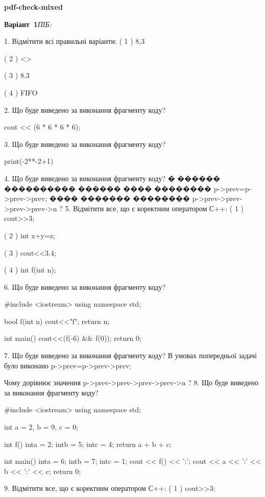 \documentclass[11pt]{article}
\begin{document}
{\large\textbf{pdf-check-mixed}}

\textbf{Варіант \No\,1}\hfill \textit{ПІБ:}\,\underline{\hspace{60mm}}
\vspace{4mm}

1. Відмітити всі правильні варіанти:
( 1 ) 8,3

( 2 ) <>

( 3 ) 8.3

( 4 ) FIFO

2. Що буде виведено за виконання фрагменту коду?

cout << (6 * 6 * 6 * 6);

3. Що буде виведено за виконання фрагменту коду?

print(-2**-2+1)

4. Що буде виведено за виконання фрагменту коду?
� ������ ���������� ������ ���� �������� p->prev=p->prev->prev;
���� ������� �������� p->prev->prev->prev->prev->n ?
5. Відмітити все, що є коректним оператором С++:
( 1 ) cout>>3;

( 2 ) int x+y=z;

( 3 ) cout<<3.4;

( 4 ) int f(int n);

6. Що буде виведено за виконання фрагменту коду?

#include <iostream>
using namespace std;

bool f(int n){
    cout<<"f";
    return n;
}

int main(){
    cout<<(f(-6) && f(0));
    return 0;
}

7. Що буде виведено за виконання фрагменту коду?
В умовах попередньої задачі було виконано p->prev=p->prev->prev;

Чому дорівнює значення p->prev->prev->prev->prev->n ?
8. Що буде виведено за виконання фрагменту коду?

#include <iostream>
using namespace std;

int a = 2, b = 9, c = 0;

int f(){
    inta = 2;
    intb = 5;
    intc = 4;
    return a + b + c;
}

int main(){
    inta = 6;
    intb = 7;
    intc = 1;
    cout << f() << ':';
    cout << a << ':' << b << ':' << c;
    return 0;
}

9. Відмітити все, що є коректним оператором С++:
( 1 ) cout>>3;
\end{document}
